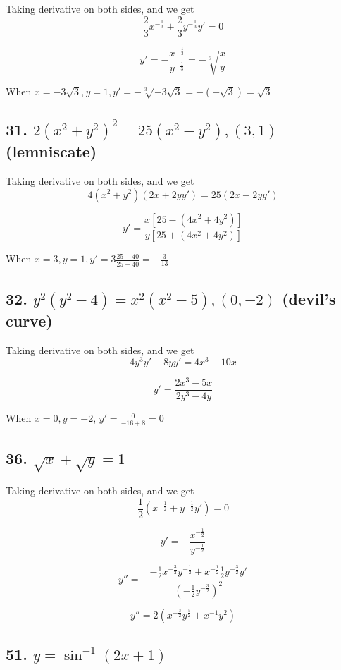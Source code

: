 \documentclass{article}
\begin{document}
    Taking derivative on both sides, and we get $$\frac 2 3 x^{-\frac 1 3} + \frac 2 3 y^{-\frac 1 3}y' = 0$$

    $$y' = -\frac{x^{-\frac 1 3}}{y^{-\frac 1 3}} = -\sqrt[3]{\frac x y}$$

    When $x = -3\sqrt 3, y = 1, y' = -\sqrt[3]{-3\sqrt 3} = -(-\sqrt 3) = \sqrt 3$
    
    \subsection*{31. $2(x^2 + y^2)^2 = 25(x^2 - y^2), (3, 1)$ (lemniscate)}

    Taking derivative on both sides, and we get $$4(x^2 + y^2)(2x + 2yy') = 25(2x - 2yy')$$

    $$y' = \frac{x[25 - (4x^2 + 4y^2)]}{y[25 + (4x^2 + 4y^2)]}$$

    When $x = 3, y = 1, y' = 3 \frac{25 - 40}{25 + 40} = -\frac{3}{13}$

    \subsection*{32. $y^2(y^2 - 4) = x^2(x^2 - 5), (0, -2)$ (devil's curve)}

    Taking derivative on both sides, and we get $$4y^3y' - 8yy' = 4x^3 - 10x$$

    $$y' = \frac{2x^3 - 5x}{2y^3 - 4y}$$

    When $x = 0, y = -2$, $y' = \frac{0}{-16 + 8} = 0$


    \subsection*{36. $\sqrt x + \sqrt y = 1$}

    Taking derivative on both sides, and we get $$\frac 1 2(x^{-\frac 1 2} + y^{-\frac 1 2}y') = 0$$

    $$y' = -\frac{x^{-\frac 1 2}}{y^{-\frac 1 2}}$$

    $$y'' = -\frac{-\frac 1 2 x^{-\frac 3 2} y^{-\frac 1 2} + x^{-\frac 1 2}\frac 1 2 y^{-\frac 3 2}y'}{(-\frac 1 2y^{-\frac 3 2}) ^2}$$

    $$y'' = 2(x^{-\frac 3 2} y^{\frac 5 2}+x^{-1} y^{2})$$


    \subsection*{51. $y = \sin ^{-1} (2x + 1)$}
\end{document}

